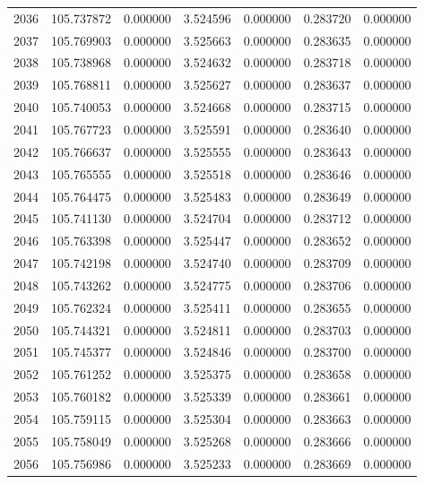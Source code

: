\begin{tabular}{rrrrrrr}
2036 & 105.737872 &    0.000000 &  3.524596 &    0.000000 &    0.283720 &  0.000000 \\
2037 & 105.769903 &    0.000000 &  3.525663 &    0.000000 &    0.283635 &  0.000000 \\
2038 & 105.738968 &    0.000000 &  3.524632 &    0.000000 &    0.283718 &  0.000000 \\
2039 & 105.768811 &    0.000000 &  3.525627 &    0.000000 &    0.283637 &  0.000000 \\
2040 & 105.740053 &    0.000000 &  3.524668 &    0.000000 &    0.283715 &  0.000000 \\
2041 & 105.767723 &    0.000000 &  3.525591 &    0.000000 &    0.283640 &  0.000000 \\
2042 & 105.766637 &    0.000000 &  3.525555 &    0.000000 &    0.283643 &  0.000000 \\
2043 & 105.765555 &    0.000000 &  3.525518 &    0.000000 &    0.283646 &  0.000000 \\
2044 & 105.764475 &    0.000000 &  3.525483 &    0.000000 &    0.283649 &  0.000000 \\
2045 & 105.741130 &    0.000000 &  3.524704 &    0.000000 &    0.283712 &  0.000000 \\
2046 & 105.763398 &    0.000000 &  3.525447 &    0.000000 &    0.283652 &  0.000000 \\
2047 & 105.742198 &    0.000000 &  3.524740 &    0.000000 &    0.283709 &  0.000000 \\
2048 & 105.743262 &    0.000000 &  3.524775 &    0.000000 &    0.283706 &  0.000000 \\
2049 & 105.762324 &    0.000000 &  3.525411 &    0.000000 &    0.283655 &  0.000000 \\
2050 & 105.744321 &    0.000000 &  3.524811 &    0.000000 &    0.283703 &  0.000000 \\
2051 & 105.745377 &    0.000000 &  3.524846 &    0.000000 &    0.283700 &  0.000000 \\
2052 & 105.761252 &    0.000000 &  3.525375 &    0.000000 &    0.283658 &  0.000000 \\
2053 & 105.760182 &    0.000000 &  3.525339 &    0.000000 &    0.283661 &  0.000000 \\
2054 & 105.759115 &    0.000000 &  3.525304 &    0.000000 &    0.283663 &  0.000000 \\
2055 & 105.758049 &    0.000000 &  3.525268 &    0.000000 &    0.283666 &  0.000000 \\
2056 & 105.756986 &    0.000000 &  3.525233 &    0.000000 &    0.283669 &  0.000000 \\

\end{tabular}
